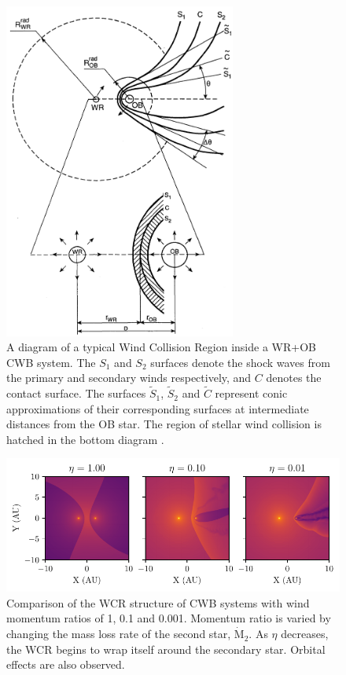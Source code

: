 \begin{figure}[h]
  \centering
  \includegraphics[width=3in]{assets/cwb-diagrams/eichler.png}
  \caption[\textit{A diagram of the Wind Collision Region \parencite{eichler_particle_1993}}]{A diagram of a typical Wind Collision Region inside a WR+OB CWB system. The $S_1$ and $S_2$ surfaces denote the shock waves from the primary and secondary winds respectively, and $C$ denotes the contact surface. The surfaces $\widetilde{S}_1$, $\widetilde{S}_2$ and $\widetilde{C}$ represent conic approximations of their corresponding surfaces at intermediate distances from the OB star. The region of stellar wind collision is hatched in the bottom diagram \parencite{eichler_particle_1993}.}
  \label{fig:wcr-diagram}
\end{figure}

\begin{figure}[h]
  \centering
  \includegraphics{assets/cwb-structure/ch1-eta-rho.pdf}
  \caption[Comparison of wind momentum ratio, $\eta$, on WCR structure]{Comparison of the WCR structure of CWB systems with wind momentum ratios of \num{1}, \num{0.1} and \num{0.001}. Momentum ratio is varied by changing the mass loss rate of the second star, $\dot{\text{M}}_2$. As $\eta$ decreases, the WCR begins to wrap itself around the secondary star. Orbital effects are also observed.}
  \label{fig:wcr-eta}
\end{figure}

